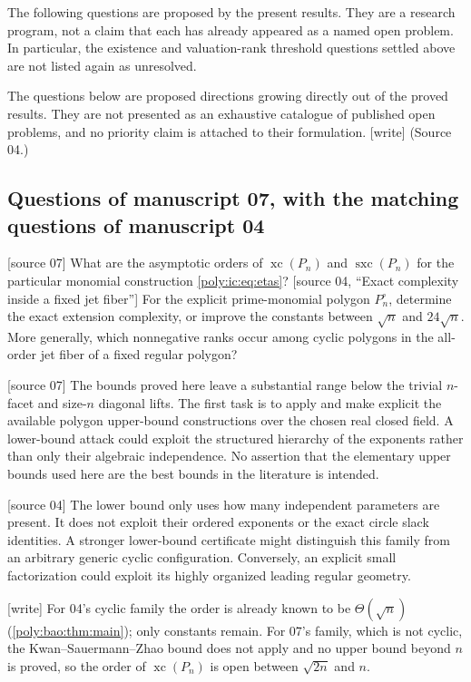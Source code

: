 \documentclass[11pt,a4paper]{article}
\numberwithin{equation}{section}
\theoremstyle{plain}
\newcommand{\wtag}{\textup{[write]}}%
\newcommand{\srcnote}[1]{\textup{[#1]}}%
\newcommand{\xc}{\operatorname{xc}}
\newcommand{\sx}{\operatorname{sxc}}
\begin{document}
The following questions are proposed by the present results. They are a
research program, not a claim that each has already appeared as a named
open problem. In particular, the existence and valuation-rank threshold
questions settled above are not listed again as unresolved.

The questions below are proposed directions growing directly out of the
proved results. They are not presented as an exhaustive catalogue of
published open problems, and no priority claim is attached to their
formulation. \wtag{} (Source 04.)

\subsection{Questions of manuscript 07, with the matching questions of manuscript 04}

\begin{question}
\srcnote{source 07} What are the asymptotic orders of $\xc(P_n)$ and $\sx(P_n)$ for the
particular monomial construction \eqref{poly:ic:eq:etas}?
\srcnote{source 04, ``Exact complexity inside a fixed jet fiber''}
For the explicit prime-monomial polygon $P^\circ_n$, determine the exact
extension complexity, or improve the constants between $\sqrt n$ and
$24\sqrt n$. More generally, which nonnegative ranks occur among cyclic
polygons in the all-order jet fiber of a fixed regular polygon?
\end{question}
\srcnote{source 07} The bounds proved here leave a substantial range below the trivial
$n$-facet and size-$n$ diagonal lifts. The first task is to apply and
make explicit the available polygon upper-bound constructions over the
chosen real closed field. A lower-bound attack could exploit the
structured hierarchy of the exponents rather than only their algebraic
independence. No assertion that the elementary upper bounds used here
are the best bounds in the literature is intended.

\srcnote{source 04} The lower bound only uses how many independent parameters are present.
It does not exploit their ordered exponents or the exact circle slack
identities. A stronger lower-bound certificate might distinguish this
family from an arbitrary generic cyclic configuration. Conversely, an
explicit small factorization could exploit its highly organized leading
regular geometry.

\wtag{} For 04's cyclic family the order is already known to be
$\Theta(\sqrt n)$ (\cref{poly:bao:thm:main}); only constants remain. For
07's family, which is not cyclic, the Kwan--Sauermann--Zhao bound does not
apply and no upper bound beyond $n$ is proved, so the order of
$\xc(P_n)$ is open between $\sqrt{2n}$ and $n$.
\end{document}
